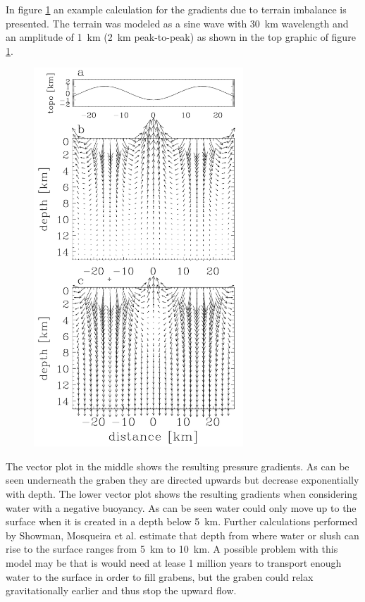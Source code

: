 In figure \ref{fig:gradients} an example calculation for the gradients
due to terrain imbalance is presented. The terrain was modeled as
a sine wave with 30~km wavelength and an amplitude of 1~km (2~km
peak-to-peak) as shown in the top graphic of figure \ref{fig:gradients}.
\begin{figure}
\begin{centering}
\includegraphics[width=0.70\textwidth]{Figures/gradients}
\par\end{centering}

\caption{\label{fig:gradients}}


\end{figure}
 The vector plot in the middle shows the resulting pressure gradients.
As can be seen underneath the graben they are directed upwards but
decrease exponentially with depth. The lower vector plot shows the
resulting gradients when considering water with a negative buoyancy.
As can be seen water could only move up to the surface when it is
created in a depth below 5~km. Further calculations performed by
Showman, Mosqueira et al. estimate that depth from where water or
slush can rise to the surface ranges from 5~km to 10~km. A possible
problem with this model may be that is would need at lease 1 million
years to transport enough water to the surface in order to fill grabens,
but the graben could relax gravitationally earlier and thus stop the
upward flow. 

